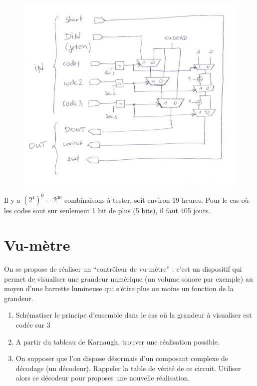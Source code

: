 \documentclass[a4paper,11pt]{article}
\begin{document}
\begin{figure}[!h]
\begin{center}
\includegraphics[scale=0.5]{./cambrioleur.png}
\end{center}
\end{figure}

\begin{cadre}
Il y a $(2^4)^9=2^{36}$ combinaisons à tester, soit environ 19 heures.
Pour le cas où les codes sont sur seulement 1 bit de plus (5 bits), il faut 405 jours.
\end{cadre}

\section{Vu-mètre}
On se propose de réaliser un ``contrôleur de vu-mètre'' : c'est un dispositif qui permet de visualiser une grandeur numérique (un volume sonore par exemple) au moyen d'une barrette lumineuse qui s'étire plus ou moins un fonction de la grandeur.
\begin{enumerate}
\item Schématiser le principe d'ensemble dans le cas où la grandeur à visualiser est codée sur 3
\item A partir du tableau de Karnaugh, trouver une réalisation possible.
\item On supposer que l'on dispose désormais d'un composant complexe de décodage (un décodeur). Rappeler la table de vérité de ce circuit. Utiliser alors ce décodeur pour proposer une nouvelle réalisation.
\end{enumerate}
\end{document}
